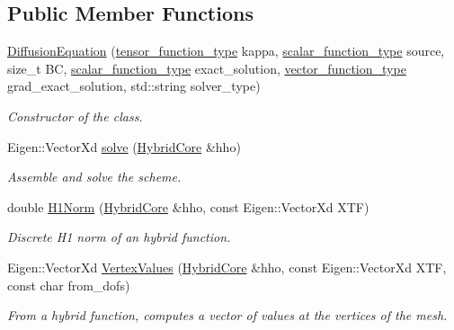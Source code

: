 \subsection*{Public Member Functions}
\begin{DoxyCompactItemize}
\item 
\hyperlink{group__HHO__diffusion_gadbba494965557d1030d76903ab250d20}{Diffusion\+Equation} (\hyperlink{classHCore2D_1_1DiffusionEquation_a1bd8e4bd048ad03f26c2bf2118c671c4}{tensor\+\_\+function\+\_\+type} kappa, \hyperlink{classHCore2D_1_1DiffusionEquation_a4d7604bc4b5cef6bf1af81a8cbad6148}{scalar\+\_\+function\+\_\+type} source, size\+\_\+t BC, \hyperlink{classHCore2D_1_1DiffusionEquation_a4d7604bc4b5cef6bf1af81a8cbad6148}{scalar\+\_\+function\+\_\+type} exact\+\_\+solution, \hyperlink{classHCore2D_1_1DiffusionEquation_a49610b0cb502efcaa1cafc7bf72f7567}{vector\+\_\+function\+\_\+type} grad\+\_\+exact\+\_\+solution, std\+::string solver\+\_\+type)
\begin{DoxyCompactList}\small\item\em Constructor of the class. \end{DoxyCompactList}\item 
Eigen\+::\+Vector\+Xd \hyperlink{group__HHO__diffusion_ga70b531740a1dfe39e9ad3a39e05d51bf}{solve} (\hyperlink{classHCore2D_1_1HybridCore}{Hybrid\+Core} \&hho)
\begin{DoxyCompactList}\small\item\em Assemble and solve the scheme. \end{DoxyCompactList}\item 
double \hyperlink{group__HHO__diffusion_ga0ed7db2e47d7f2404c2722c1f638d730}{H1\+Norm} (\hyperlink{classHCore2D_1_1HybridCore}{Hybrid\+Core} \&hho, const Eigen\+::\+Vector\+Xd X\+TF)
\begin{DoxyCompactList}\small\item\em Discrete H1 norm of an hybrid function. \end{DoxyCompactList}\item 
Eigen\+::\+Vector\+Xd \hyperlink{group__HHO__diffusion_ga69202d77de6ce79869779ea8edec1481}{Vertex\+Values} (\hyperlink{classHCore2D_1_1HybridCore}{Hybrid\+Core} \&hho, const Eigen\+::\+Vector\+Xd X\+TF, const char from\+\_\+dofs)
\begin{DoxyCompactList}\small\item\em From a hybrid function, computes a vector of values at the vertices of the mesh. \end{DoxyCompactList}\item 

\end{DoxyCompactItemize}
